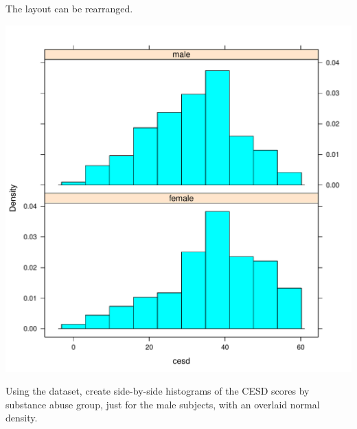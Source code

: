 The layout can be rearranged.
%
\begin{center}
\begin{knitrout}
\color{fgcolor}\begin{kframe}
\begin{alltt}
\hlstd{(}\hlopt{~}  \hlopt{|}  \hlstd{=}\hlstd{(}\hlstd{,} \hlstd{),} 
\end{alltt}
\end{kframe}
\includegraphics[width=\maxwidth]{figure/cesd-dotlayout-1} 

\end{knitrout}
\end{center}
\begin{problem}
Using the  dataset, 
create side-by-side histograms of the CESD scores by substance abuse
group, just for the male subjects, with an overlaid normal density.
\end{problem}%
